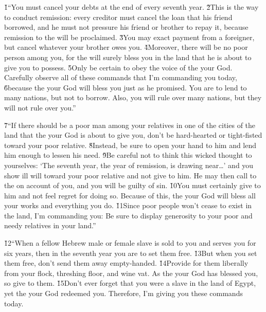 \v{1}``You must cancel your debts at the end of every seventh year. \v{2}This is the way to conduct remission: every creditor must cancel the loan that his friend borrowed, and he must not pressure his friend or brother to repay it, because remission to the  will be proclaimed. \v{3}You may exact payment from a foreigner, but cancel whatever your brother owes you. \v{4}Moreover, there will be no poor person among you, for the  will surely bless you in the land that he is about to give you to possess. \v{5}Only be certain to obey the voice of the  your God. Carefully observe all of these commands that I'm commanding you today, \v{6}because the  your God will bless you just as he promised. You are to lend to many nations, but not to borrow. Also, you will rule over many nations, but they will not rule over you.''

\v{7}``If there should be a poor man among your relatives in one of the cities of the land that the  your God is about to give you, don't be hard-hearted or tight-fisted toward your poor relative. \v{8}Instead, be sure to open your hand to him and lend him enough to lessen his need. \v{9}Be careful not to think this wicked thought to yourselves: `The seventh year, the year of remission, is drawing near{\ldots}' and you show ill will toward your poor relative and not give to him. He may then call to the  on account of you, and you will be guilty of sin. \v{10}You must certainly give to him and not feel regret for doing so. Because of this, the  your God will bless all your works and everything you do. \v{11}Since poor people won't cease to exist in the land, I'm commanding you: Be sure to display generosity to your poor and needy relatives in your land.''

\v{12}``When a fellow Hebrew male or female slave is sold to you and serves you for six years, then in the seventh year you are to set them free. \v{13}But when you set them free, don't send them away empty-handed. \v{14}Provide for them liberally from your flock, threshing floor, and wine vat. As the  your God has blessed you, so give to them. \v{15}Don't ever forget that you were a slave in the land of Egypt, yet the  your God redeemed you. Therefore, I'm giving you these commands today.


